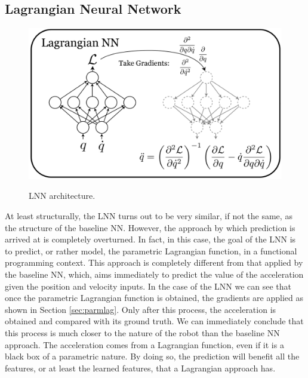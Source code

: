 \documentclass[a4paper]{article}
\begin{document}
\subsection{Lagrangian Neural Network}
\begin{figure}
\begin{center}
    \label{img:lnn_arch}
    \includegraphics[scale=0.1]{./img/lnn.png}  
    \caption{LNN architecture.}
\end{center}
\end{figure}
At least structurally, the LNN turns out to be very similar, if not the same, as the structure of the baseline NN. However, the approach by which prediction is arrived at is completely overturned. In fact, in this case, the goal of the LNN is to predict, or rather model, the parametric Lagrangian function, in a functional programming context. This approach is completely different from that applied by the baseline NN, which, aims immediately to predict the value of the acceleration given the position and velocity inputs. In the case of the LNN we can see that once the parametric Lagrangian function is obtained, the gradients are applied as shown in Section \ref{sec:parmlag}. Only after this process, the acceleration is obtained and compared with its ground truth. We can immediately conclude that this process is much closer to the nature of the robot than the baseline NN approach. The acceleration comes from a Lagrangian function, even if it is a black box of a parametric nature. By doing so, the prediction will benefit all the features, or at least the learned features, that a Lagrangian approach has.

\end{document}

